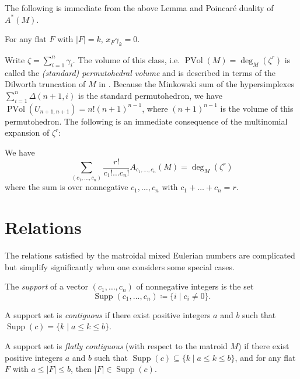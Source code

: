 \documentclass[ALCO,published]{cedram}
\numberwithin{equation}{section}
\numberwithin{figure}{section}
\DeclareMathOperator{\Supp}{Supp}
\begin{document}
The following is immediate from the above Lemma and Poincar\'{e} duality of $A^*(M)$.

\begin{coro} \label{c:annihilateflat}
For any flat $F$ with $|F|=k$, $x_F\gamma_k=0$.     
\end{coro}


Write $\zeta=\sum_{i=1}^n \gamma_i$. The volume of this class, i.e. $\operatorname{PVol}(M)=\deg_M(\zeta^{r})$ is called the {\em (standard) permutohedral volume} and is described in terms of the Dilworth truncation of $M$ in \cite[Theorem~7.1.6]{Eur:thesis}. Because the Minkowski sum of the hypersimplexes $\sum_{i=1}^n \Delta(n+1,i)$ is the standard permutohedron, we have $\operatorname{PVol}(U_{n+1,n+1}) = n! (n+1)^{n-1}$, where $(n+1)^{n-1}$ is the volume of this permutohedron. The following is an immediate consequence of the multinomial expansion of $\zeta^r$:

\begin{lemma} \label{l:pvol}
We have
\[\sum_{(c_1,\dots,c_n)} \frac{r!}{c_1!\dots c_n!}A_{c_1,\dots,c_n}(M)=\deg_M(\zeta^r)\]
where the sum is over nonnegative $c_1,\dots,c_n$ with $c_1+\dots+c_n=r$.
\end{lemma}


\section{Relations} \label{s:relations}

The relations satisfied by the matroidal mixed Eulerian numbers are complicated but simplify significantly when one considers some special cases.

\begin{defi}
    The {\em support} of a vector $(c_1,\dots,c_n)$ of nonnegative integers is the set
    \[\Supp(c_1,\dots,c_n)\coloneqq \{i\mid c_i\neq 0\}.\]
\end{defi}

\begin{defi}
    A support set is {\em contiguous} if there exist positive integers $a$ and $b$ such that $\Supp(c)=\{k\mid a\leq k\leq b\}$.
    
    A support set is {\em flatly contiguous} (with respect to the matroid $M$) if there exist positive integers $a$ and $b$ such that $\Supp(c)\subseteq \{k\mid a\leq k\leq b\}$, and
    for any flat $F$ with $a\leq|F|\leq b$, then $|F|\in\Supp(c)$.
\end{defi}
\end{document}
